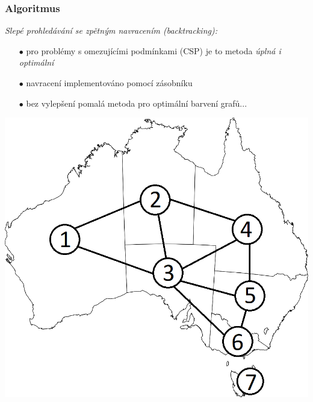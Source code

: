 \documentclass[10pt,xcolor=pdflatex]{beamer}
\begin{document}
\begin{frame}\frametitle{Algoritmus}
    \emph{Slepé prohledávání se zpětným navracením (backtracking):}
    \begin{itemize}
    \item[$\bullet$] pro problémy s omezujícími podmínkami (CSP) je to metoda \emph{úplná i optimální}
    \item[$\bullet$] navracení implementováno pomocí zásobníku
    \item[$\bullet$] bez vylepšení pomalá metoda pro optimální barvení grafů...
	\end{itemize}
    \includegraphics[scale=0.3]{img/australia.png}

\end{frame}
\end{document}
